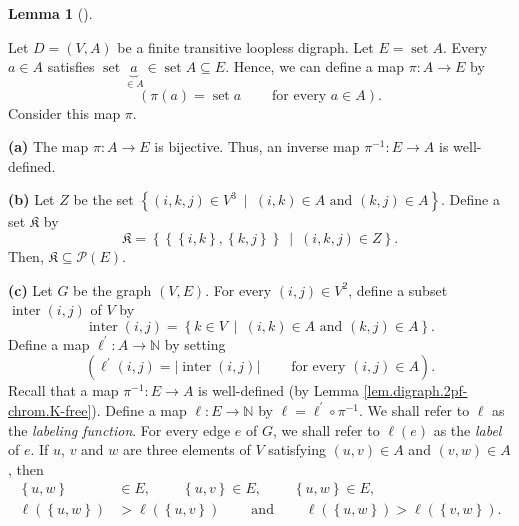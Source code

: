 \documentclass[numbers=enddot,12pt,final,onecolumn,notitlepage]{scrartcl}%
\theoremstyle{definition}
\newtheorem{lem}[theo]{Lemma}
\newenvironment{lemma}[1][]
{\begin{lem}[#1]\begin{leftbar}}
{\end{leftbar}\end{lem}}
\newenvironment{verlong}{}{}
\begin{document}
\begin{verlong}
\begin{lemma}
\label{lem.digraph.2pf-chrom.K-free}Let $D=\left(  V,A\right)  $ be a finite
transitive loopless digraph. Let $E=\operatorname*{set}A$. Every $a\in A$
satisfies $\operatorname*{set}\underbrace{a}_{\in A}\in\operatorname*{set}%
A\subseteq E$. Hence, we can define a map $\pi:A\rightarrow E$ by%
\[
\left(  \pi\left(  a\right)  =\operatorname*{set}%
a\ \ \ \ \ \ \ \ \ \ \text{for every }a\in A\right)  .
\]
Consider this map $\pi$.

\textbf{(a)} The map $\pi:A\rightarrow E$ is bijective. Thus, an inverse map
$\pi^{-1}:E\rightarrow A$ is well-defined.

\textbf{(b)} Let $Z$ be the set $\left\{  \left(  i,k,j\right)  \in
V^{3}\ \mid\ \left(  i,k\right)  \in A\text{ and }\left(  k,j\right)  \in
A\right\}  $. Define a set $\mathfrak{K}$ by
\[
\mathfrak{K}=\left\{  \left\{  \left\{  i,k\right\}  ,\left\{  k,j\right\}
\right\}  \ \mid\ \left(  i,k,j\right)  \in Z\right\}  .
\]
Then, $\mathfrak{K}\subseteq\mathcal{P}\left(  E\right)  $.

\textbf{(c)} Let $G$ be the graph $\left(  V,E\right)  $. For every $\left(
i,j\right)  \in V^{2}$, define a subset $\operatorname*{inter}\left(
i,j\right)  $ of $V$ by%
\[
\operatorname*{inter}\left(  i,j\right)  =\left\{  k\in V\ \mid\ \left(
i,k\right)  \in A\text{ and }\left(  k,j\right)  \in A\right\}  .
\]
Define a map $\ell^{\prime}:A\rightarrow\mathbb{N}$ by setting%
\[
\left(  \ell^{\prime}\left(  i,j\right)  =\left\vert \operatorname*{inter}%
\left(  i,j\right)  \right\vert \ \ \ \ \ \ \ \ \ \ \text{for every }\left(
i,j\right)  \in A\right)  .
\]
Recall that a map $\pi^{-1}:E\rightarrow A$ is well-defined (by Lemma
\ref{lem.digraph.2pf-chrom.K-free}). Define a map $\ell:E\rightarrow
\mathbb{N}$ by $\ell=\ell^{\prime}\circ\pi^{-1}$. We shall refer to $\ell$ as
the \textit{labeling function}. For every edge $e$ of $G$, we shall refer to
$\ell\left(  e\right)  $ as the \textit{label} of $e$. If $u$, $v$ and $w$ are
three elements of $V$ satisfying $\left(  u,v\right)  \in A$ and $\left(
v,w\right)  \in A$, then%
\begin{align}
\left\{  u,w\right\}   &  \in E,\ \ \ \ \ \ \ \ \ \ \left\{  u,v\right\}  \in
E,\ \ \ \ \ \ \ \ \ \ \left\{  u,w\right\}  \in
E,\label{eq.lem.digraph.2pf-chrom.K-free.c.1}\\
\ell\left(  \left\{  u,w\right\}  \right)   &  >\ell\left(  \left\{
u,v\right\}  \right)  \ \ \ \ \ \ \ \ \ \ \text{and}\ \ \ \ \ \ \ \ \ \ \ell
\left(  \left\{  u,w\right\}  \right)  >\ell\left(  \left\{  v,w\right\}
\right)  . \label{eq.lem.digraph.2pf-chrom.K-free.c.2}%
\end{align}



\end{lemma}
\end{verlong}
\end{document}
